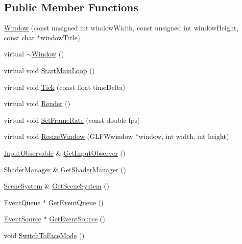 \subsection*{Public Member Functions}
\begin{DoxyCompactItemize}
\item 
\mbox{\hyperlink{classec_1_1_window_af9eab51c6ea017a296866278bbbcdb28}{Window}} (const unsigned int window\+Width, const unsigned int window\+Height, const char $\ast$window\+Title)
\item 
virtual \mbox{\hyperlink{classec_1_1_window_a639d3f230ca0e232066b4c61a5a212b7}{$\sim$\+Window}} ()
\item 
virtual void \mbox{\hyperlink{classec_1_1_window_a1cde792adea9d3e15f7bab9c3100a8b9}{Start\+Main\+Loop}} ()
\item 
virtual void \mbox{\hyperlink{classec_1_1_window_aab4c6c1ee3c71e53532ec21a253cad4d}{Tick}} (const float time\+Delta)
\item 
virtual void \mbox{\hyperlink{classec_1_1_window_af0be4ef5101cfd9251511c402c1e9598}{Render}} ()
\item 
virtual void \mbox{\hyperlink{classec_1_1_window_a5fa670ea10ce548d445e1a82ded336a2}{Set\+Frame\+Rate}} (const double fps)
\item 
virtual void \mbox{\hyperlink{classec_1_1_window_a95ea89916704775d858e441c8b7430cd}{Resize\+Window}} (G\+L\+F\+Wwindow $\ast$window, int width, int height)
\item 
\mbox{\hyperlink{classec_1_1_input_observable}{Input\+Observable}} \& \mbox{\hyperlink{classec_1_1_window_a0f2af2fca7c4c20d027acf6afaf79b99}{Get\+Input\+Observer}} ()
\item 
\mbox{\hyperlink{classec_1_1_shader_manager}{Shader\+Manager}} \& \mbox{\hyperlink{classec_1_1_window_a5f2d20a2d7b3bc05c29830164437d190}{Get\+Shader\+Manager}} ()
\item 
\mbox{\hyperlink{classec_1_1_scene_system}{Scene\+System}} \& \mbox{\hyperlink{classec_1_1_window_aad83b5eb3bb0708c08503ac3c6b7b670}{Get\+Scene\+System}} ()
\item 
\mbox{\hyperlink{classec_1_1_event_queue}{Event\+Queue}} $\ast$ \mbox{\hyperlink{classec_1_1_window_a7d0d9e287c7dbf2377755ed89ea6848c}{Get\+Event\+Queue}} ()
\item 
\mbox{\hyperlink{classec_1_1_event_source}{Event\+Source}} $\ast$ \mbox{\hyperlink{classec_1_1_window_a7253c61f74c2f5f6281d546379ca20e0}{Get\+Event\+Source}} ()
\item 
void \mbox{\hyperlink{classec_1_1_window_aefcd8fd06bb58f946100005975fc94c4}{Switch\+To\+Face\+Mode}} ()

\end{DoxyCompactItemize}
